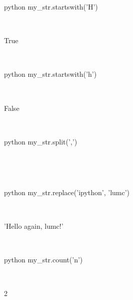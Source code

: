 \documentclass[aspectratio=1610,slidestop]{beamer}
\begin{document}
\begin{pframe}
 \begin{ipython}
   \begin{pythonin}{python}
my_str.startswith('H')
   \end{pythonin}
   \\
   \begin{pythonout}
True
   \end{pythonout}
   \\

   \begin{pythonin}{python}
my_str.startswith('h')
   \end{pythonin}
   \\
   \begin{pythonout}
False
   \end{pythonout}
   \\

   \begin{pythonin}{python}
my_str.split(',')
   \end{pythonin}
   \\
   \begin{pythonout}
   \end{pythonout}
   \\

   \begin{pythonin}{python}
my_str.replace('ipython', 'lumc')
   \end{pythonin}
   \\
   \begin{pythonout}
'Hello again, lumc!'
   \end{pythonout}
   \\

   \begin{pythonin}{python}
my_str.count('n')
   \end{pythonin}
   \\
   \begin{pythonout}
2
   \end{pythonout}
 \end{ipython}
\end{pframe}
\end{document}
